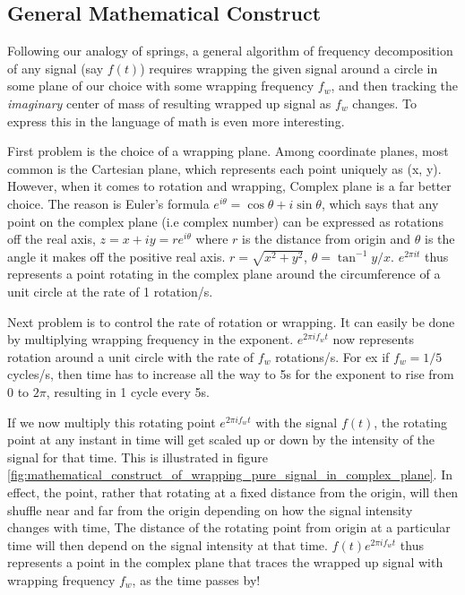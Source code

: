 \documentclass[11pt, a4paper]{article}
\newcommand{\quotedsingle}[1]{#1}	%
\newcommand{\quotedsingleit}[1]{\quotedsingle{\textit{#1}}}	%
\begin{document}
	\subsection{General Mathematical Construct}
	Following our analogy of springs, a general algorithm of frequency decomposition of any signal (say $f(t)$) requires wrapping the given signal around a circle in some plane of our choice with some wrapping frequency $f_{w}$, and then tracking the  \quotedsingleit{imaginary} center of mass of resulting wrapped up signal as $f_{w}$ changes. To express this in the language of math is even more interesting.
	
	First problem is the choice of a wrapping plane. Among coordinate planes, most common is the Cartesian plane, which represents each point uniquely as (x, y). However, when it comes to rotation and wrapping, Complex plane is a far better choice. The reason is Euler's formula $e^{i\theta} = \cos\theta + i\sin\theta$, which says that any point on the complex plane (i.e complex number) can be expressed as rotations off the real axis, $z = x + iy = re^{i\theta}$ where $r$ is the distance from origin and $\theta$ is the angle it makes off the positive real axis. $r = \sqrt{x^2 + y^2}$, $\theta = \tan^{-1}y/x$. $e^{2\pi it}$ thus represents a point rotating in the complex plane around the circumference of a unit circle at the rate of 1 rotation/s.
	
	Next problem is to control the rate of rotation or wrapping. It can easily be done by multiplying wrapping frequency in the exponent. $e^{2\pi if_{w}t}$ now represents rotation around a unit circle with the rate of $f_{w}$ rotations/s. For ex if $f_{w} = 1/5$ cycles/s, then time has to increase all the way to 5s for the exponent to rise from $0$ to $2\pi$, resulting in 1 cycle every 5s.

	If we now multiply this rotating point $e^{2\pi if_{w}t}$ with the signal $f(t)$, the rotating point at any instant in time will get scaled up or down by the intensity of the signal for that time. This is illustrated in figure \ref{fig:mathematical_construct_of_wrapping_pure_signal_in_complex_plane}. In effect, the point, rather that rotating at a fixed distance from the origin, will then shuffle near and far from the origin depending on how the signal intensity changes with time, The distance of the rotating point from origin at a particular time will then depend on the signal intensity at that time. $f(t)e^{2\pi if_{w}t}$ thus represents a point in the complex plane that traces the wrapped up signal with wrapping frequency $f_{w}$, as the time passes by!
	
\end{document}
